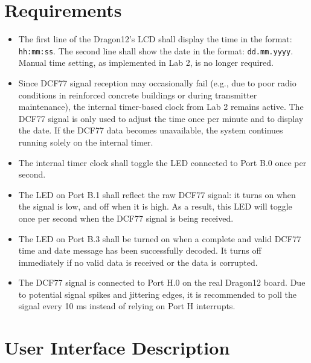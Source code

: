 \documentclass[a4paper,12pt]{article}
\begin{document}
\section{Requirements}
\begin{itemize}
    \item The first line of the Dragon12’s LCD shall display the time in the format: \texttt{hh:mm:ss}.  
    The second line shall show the date in the format: \texttt{dd.mm.yyyy}.  
    Manual time setting, as implemented in Lab 2, is no longer required.

    \item Since DCF77 signal reception may occasionally fail (e.g., due to poor radio conditions in reinforced concrete buildings or during transmitter maintenance), the internal timer-based clock from Lab 2 remains active.  
    The DCF77 signal is only used to adjust the time once per minute and to display the date.  
    If the DCF77 data becomes unavailable, the system continues running solely on the internal timer.

    \item The internal timer clock shall toggle the LED connected to Port B.0 once per second.

    \item The LED on Port B.1 shall reflect the raw DCF77 signal:  
    it turns on when the signal is low, and off when it is high.  
    As a result, this LED will toggle once per second when the DCF77 signal is being received.

    \item The LED on Port B.3 shall be turned on when a complete and valid DCF77 time and date message has been successfully decoded.  
    It turns off immediately if no valid data is received or the data is corrupted.

    \item The DCF77 signal is connected to Port H.0 on the real Dragon12 board.  
    Due to potential signal spikes and jittering edges, it is recommended to poll the signal every 10 ms instead of relying on Port H interrupts.
\end{itemize}

\newpage


\section{User Interface Description}
\end{document}

